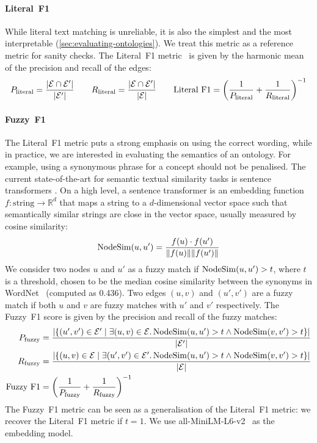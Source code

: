 \paragraph{Literal~F1}
While literal text matching is unreliable, it is also the simplest and the most interpretable (\cref{sec:evaluating-ontologies}). We treat this metric as a reference metric for sanity checks. The Literal~F1 metric~\cite{Kashyap2005TaxaMinerAE} is given by the harmonic mean of the precision and recall of the edges:
\[
    P_{\text{literal}} = \frac{|\mathcal{E} \cap \mathcal{E}'|}{|\mathcal{E}'|} \qquad
    R_{\text{literal}} = \frac{|\mathcal{E} \cap \mathcal{E}'|}{|\mathcal{E}|} \qquad
    \text{Literal~F1} = \left(\frac{1}{P_{\text{literal}}} + \frac{1}{R_{\text{literal}}}\right)^{-1}
\]

\paragraph{Fuzzy~F1}
The Literal~F1 metric puts a strong emphasis on using the correct wording, while in practice, we are interested in evaluating the semantics of an ontology. For example, using a synonymous phrase for a concept should not be penalised. The current state-of-the-art for semantic textual similarity tasks is sentence transformers \cite{reimers-2019-sentence-bert,jiang2022improved,jiang2019smart}. On a high level, a sentence transformer is an embedding function $f: \text{string} \to \mathbb{R}^d$ that maps a string to a $d$-dimensional vector space such that semantically similar strings are close in the vector space, usually measured by cosine similarity:
\[
    \operatorname{NodeSim}(u, u') = \frac{f(u) \cdot f(u')}{\|f(u)\| \|f(u')\|}
\]
We consider two nodes $u$ and $u'$ as a fuzzy match if $\operatorname{NodeSim}(u, u') > t$, where $t$ is a threshold, chosen to be the median cosine similarity between the synonyms in WordNet~\cite{miller1995wordnet} (computed as 0.436). Two edges $(u, v)$ and $(u', v')$ are a fuzzy match if both $u$ and $v$ are fuzzy matches with $u'$ and $v'$ respectively. The Fuzzy~F1 score is given by the precision and recall of the fuzzy matches:
\begin{equation*}
    \begin{aligned}
        P_{\text{fuzzy}} & = \frac{|
            \{(u', v') \in \mathcal{E}' \mid \exists (u, v) \in \mathcal{E}.
            \operatorname{NodeSim}(u, u') > t \land \operatorname{NodeSim}(v, v') > t
            \}
        |}{|\mathcal{E}'|}                                                                                      \\
        R_{\text{fuzzy}} & = \frac{|
            \{(u, v) \in \mathcal{E} \mid \exists (u', v') \in \mathcal{E}'.
            \operatorname{NodeSim}(u, u') > t \land \operatorname{NodeSim}(v, v') > t
            \}
        |}{|\mathcal{E}|}                                                                                       \\
        \text{Fuzzy~F1}  & = \left(\frac{1}{P_{\text{fuzzy}}} + \frac{1}{R_{\text{fuzzy}}}\right)^{-1}
    \end{aligned}
\end{equation*}
The Fuzzy~F1 metric can be seen as a generalisation of the Literal~F1 metric: we recover the Literal~F1 metric if $t = 1$. We use all-MiniLM-L6-v2~\cite{wang2020minilm,reimers-2019-sentence-bert} as the embedding model.

